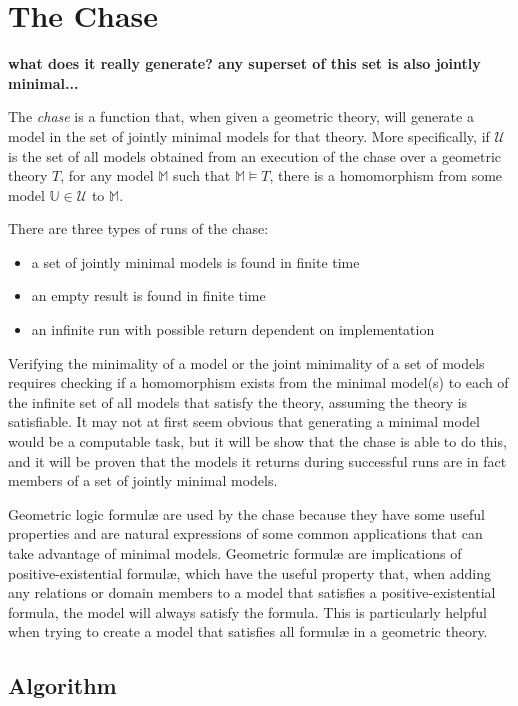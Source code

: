 \section{The Chase}

	\textbf{ what does it really generate? any superset of this set is also jointly minimal... }

	The \emph{chase} is a function that, when given a geometric theory, will
	generate a model in the set of jointly minimal models for that theory. More
	specifically, if $\mathcal{U}$ is the set of all models obtained from an
	execution of the chase over a geometric theory $T$, for any model
	$\mathbb{M}$ such that $\mathbb{M} \models T$, there is a homomorphism from
	some model $\mathbb{U} \in \mathcal{U}$ to $\mathbb{M}$.

	There are three types of runs of the chase:
	\begin{itemize}
	\item a set of jointly minimal models is found in finite time
	\item an empty result is found in finite time
	\item an infinite run with possible return dependent on implementation
	\end{itemize}

	Verifying the minimality of a model or the joint minimality of a set of
	models requires checking if a homomorphism exists from the minimal model(s)
	to each of the infinite set of all models that satisfy the theory, assuming
	the theory is satisfiable. It may not at first seem obvious that generating
	a minimal model would be a computable task, but it will be show that the
	chase is able to do this, and it will be proven that the models it returns
	during successful runs are in fact members of a set of jointly minimal
	models.

	Geometric logic formul{\ae} are used by the chase because they have some
	useful properties and are natural expressions of some common applications
	that can take advantage of minimal models. Geometric formul{\ae} are
	implications of positive-existential formul{\ae}, which have the useful
	property that, when adding any relations or domain members to a model that
	satisfies a positive-existential formula, the model will always satisfy the
	formula. This is particularly helpful when trying to create a model that
	satisfies all formul{\ae} in a geometric theory.

	\subsection{Algorithm}

